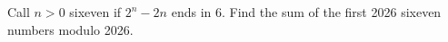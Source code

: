 Call $n>0$ sixeven if $2^n-2n$ ends in 6. Find the sum of the first 2026 sixeven numbers modulo 2026.
